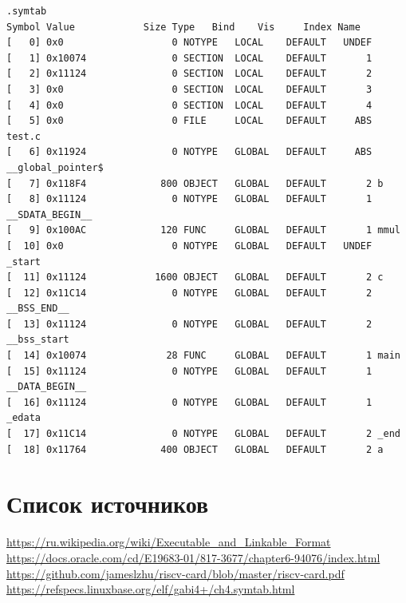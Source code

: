 \documentclass{article}
\begin{document}
\begin{lstlisting}
.symtab
Symbol Value          	Size Type 	Bind 	Vis   	Index Name
[   0] 0x0                   0 NOTYPE   LOCAL    DEFAULT   UNDEF 
[   1] 0x10074               0 SECTION  LOCAL    DEFAULT       1 
[   2] 0x11124               0 SECTION  LOCAL    DEFAULT       2 
[   3] 0x0                   0 SECTION  LOCAL    DEFAULT       3 
[   4] 0x0                   0 SECTION  LOCAL    DEFAULT       4 
[   5] 0x0                   0 FILE     LOCAL    DEFAULT     ABS test.c
[   6] 0x11924               0 NOTYPE   GLOBAL   DEFAULT     ABS __global_pointer$
[   7] 0x118F4             800 OBJECT   GLOBAL   DEFAULT       2 b
[   8] 0x11124               0 NOTYPE   GLOBAL   DEFAULT       1 __SDATA_BEGIN__
[   9] 0x100AC             120 FUNC     GLOBAL   DEFAULT       1 mmul
[  10] 0x0                   0 NOTYPE   GLOBAL   DEFAULT   UNDEF _start
[  11] 0x11124            1600 OBJECT   GLOBAL   DEFAULT       2 c
[  12] 0x11C14               0 NOTYPE   GLOBAL   DEFAULT       2 __BSS_END__
[  13] 0x11124               0 NOTYPE   GLOBAL   DEFAULT       2 __bss_start
[  14] 0x10074              28 FUNC     GLOBAL   DEFAULT       1 main
[  15] 0x11124               0 NOTYPE   GLOBAL   DEFAULT       1 __DATA_BEGIN__
[  16] 0x11124               0 NOTYPE   GLOBAL   DEFAULT       1 _edata
[  17] 0x11C14               0 NOTYPE   GLOBAL   DEFAULT       2 _end
[  18] 0x11764             400 OBJECT   GLOBAL   DEFAULT       2 a
\end{lstlisting}
\section*{Список источников}
\url{https://ru.wikipedia.org/wiki/Executable_and_Linkable_Format}\\
\url{https://docs.oracle.com/cd/E19683-01/817-3677/chapter6-94076/index.html}\\
\url{https://github.com/jameslzhu/riscv-card/blob/master/riscv-card.pdf}\\
\url{https://refspecs.linuxbase.org/elf/gabi4+/ch4.symtab.html}
\end{document}
